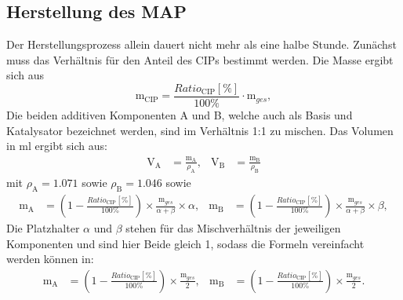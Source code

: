 \subsection{Herstellung des MAP} \FloatBarrier
Der Herstellungsprozess allein dauert nicht mehr als eine halbe Stunde. Zunächst muss das Verhältnis für den Anteil des CIPs bestimmt werden. Die Masse ergibt sich aus
\begin{equation}
\text{m}_{\text{CIP}} = \frac{Ratio_{\text{CIP}} [\%]}{100\%}\cdot\text{m}_{ges},
\end{equation}
Die beiden additiven Komponenten A und B, welche auch als Basis und Katalysator bezeichnet werden, sind im Verhältnis 1:1 zu mischen. Das Volumen in \unit{ml} ergibt sich aus:
\begin{align}
\text{V}_\text{A} &= \frac{\text{m}_\text{A}}{\rho_\text{A}} ,& 
\text{V}_\text{B} &= \frac{\text{m}_\text{B}}{\rho_\text{B}}
\end{align}
mit $\rho_\text{A} = 1.071$ sowie $\rho_\text{B} = 1.046$ sowie
\begin{align}	
\text{m}_\text{A} &= \left( 1- \frac{Ratio_{\text{CIP}} [\%]}{100\%}\right)\times
\frac{\text{m}_{ges}}{\alpha + \beta}\times\alpha ,&
\text{m}_\text{B} &= \left( 1- \frac{Ratio_{\text{CIP}} [\%]}{100\%}\right)\times
\frac{\text{m}_{ges}}{\alpha + \beta}\times\beta,
\end{align}
Die Platzhalter $\alpha$ und $\beta$ stehen für das Mischverhältnis der jeweiligen Komponenten und sind hier Beide gleich 1, sodass die Formeln vereinfacht werden können in:
\begin{align}	
\text{m}_\text{A} &= \left( 1- \frac{Ratio_{\text{CIP}} [\%]}{100\%}\right)\times
\frac{\text{m}_{ges}}{2} ,&
\text{m}_\text{B} &= \left( 1- \frac{Ratio_{\text{CIP}} [\%]}{100\%}\right)\times
\frac{\text{m}_{ges}}{2}.
\end{align}

